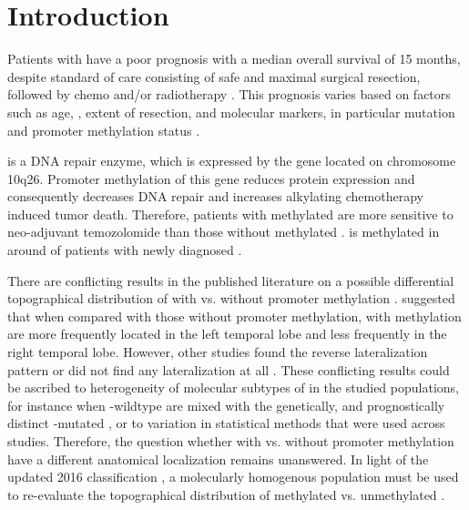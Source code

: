 \section{Introduction}

Patients with  have a poor prognosis with a median overall survival of 15 months, despite standard of care consisting of safe and maximal surgical resection, followed by chemo and/or radiotherapy \autocite{stupp2005radiotherapy}.
This prognosis varies based on factors such as age, , extent of resection, and molecular markers, in particular  mutation and  promoter methylation status \autocite{gessler2018surgery}.

 is a DNA repair enzyme, which is expressed by the  gene located on chromosome 10q26.
Promoter methylation of this gene reduces  protein expression and consequently decreases DNA repair and increases alkylating chemotherapy induced \gls{tumor} death.
Therefore, patients with  methylated  are more sensitive to neo-adjuvant temozolomide than those without  methylated .
 is methylated in around  of patients with newly diagnosed  \autocite{hegi2005MGMT}.

There are conflicting results in the published literature on a possible differential topographical distribution of  with vs. without  promoter methylation \autocite{smits2017imaging}.
 suggested that when compared with those without  promoter methylation,  with  methylation are more frequently located in the left temporal lobe and less frequently in the right temporal lobe.
However, other studies found the reverse lateralization pattern \autocite{wang2014anatomical} or did not find any lateralization at all \autocite{carillo2012relationship, eoli2007methylation, han2018structural}.
These conflicting results could be ascribed to heterogeneity of molecular subtypes of  in the studied populations, for instance when -wildtype  are mixed with the genetically, and prognostically distinct -mutated , or to variation in statistical methods that were used across studies.
Therefore, the question whether  with vs. without  promoter methylation have a different anatomical localization remains unanswered.
In light of the updated  2016 classification \autocite{louis20162016}, a molecularly homogenous  population must be used to re-evaluate the topographical distribution of  methylated vs. unmethylated .

